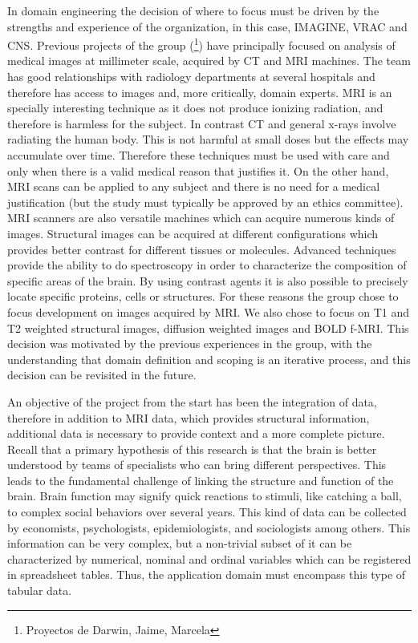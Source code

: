 In domain engineering the decision of where to focus must be driven by the strengths and experience of the organization, in this case, IMAGINE, VRAC and CNS. Previous projects of the group (\footnote{Proyectos de Darwin, Jaime, Marcela}) have principally focused on analysis of medical images at millimeter scale, acquired by CT and MRI machines. The team has good relationships with radiology departments at several hospitals and therefore has access to images and, more critically, domain experts. MRI is an specially interesting technique as it does not produce ionizing radiation, and therefore is harmless for the subject. In contrast CT and general x-rays involve radiating the human body. This is not harmful at small doses but the effects may accumulate over time. Therefore these techniques must be used with care and only when there is a valid medical reason that justifies it. On the other hand, MRI scans can be applied to any subject and there is no need for a medical justification (but the study must typically be approved by an ethics committee). MRI scanners are also versatile machines which can acquire numerous kinds of images. Structural images can be acquired at different configurations which provides better contrast for different tissues or molecules. Advanced techniques provide the ability to do spectroscopy in order to characterize the composition of specific areas of the brain. By using contrast agents it is also possible to precisely locate specific proteins, cells or structures. 
For these reasons the group chose to focus development on images acquired by MRI. We also chose to focus on T1 and T2 weighted structural images, diffusion weighted images and BOLD f-MRI. This decision was motivated by the previous experiences in the group, with the understanding that domain definition and scoping is an iterative process, and this decision can be revisited in the future.

An objective of the project from the start has been the integration of data, therefore in addition to MRI data, which provides structural information, additional data is necessary to provide context and a more complete picture. Recall that a primary  hypothesis of this research is that the brain is better understood by teams of specialists who can bring different perspectives. This leads to the fundamental  challenge of linking the structure and function of the brain. Brain function may signify quick reactions to stimuli, like catching a ball, to complex social behaviors over several years. This kind of data can be collected by economists, psychologists, epidemiologists, and sociologists among others. This information can be very complex, but a non-trivial subset of it can be characterized by numerical, nominal and ordinal variables which can be registered in spreadsheet tables. Thus, the application domain must encompass this type of tabular data. 

